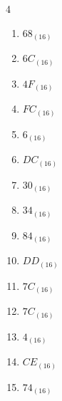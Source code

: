 \begin{multicols}{4}
\begin{enumerate}
        \phantom{$=197$}

  \item $68_{(16)}$

        \phantom{$=104$}

  \item $6C_{(16)}$

        \phantom{$=108$}

  \item $4F_{(16)}$

        \phantom{$=79$}

  \item $FC_{(16)}$

        \phantom{$=252$}

  \item $6_{(16)}$

        \phantom{$=6$}

  \item $DC_{(16)}$

        \phantom{$=220$}

\columnbreak %

  \item $30_{(16)}$

        \phantom{$=48$}

  \item $34_{(16)}$

        \phantom{$=52$}

  \item $84_{(16)}$

        \phantom{$=132$}

  \item $DD_{(16)}$

        \phantom{$=221$}

  \item $7C_{(16)}$

        \phantom{$=124$}

  \item $7C_{(16)}$

        \phantom{$=124$}

  \item $4_{(16)}$

        \phantom{$=4$}

  \item $CE_{(16)}$

        \phantom{$=206$}

  \item $74_{(16)}$

        \phantom{$=116$}


\end{enumerate}
\end{multicols}
